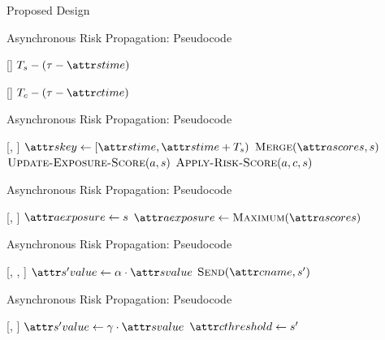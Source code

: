 \documentclass[11pt]{beamer}
\begin{document}
\begin{section}{Proposed Design}
\begin{frame}{Asynchronous Risk Propagation: Pseudocode}
\begin{function}{\nRiskScoreTtl}[\vScore]
  \State \Return $\pScoreExpiry - (\vReferenceTime - \aScoreTime)$
\end{function}
\begin{function}{\nContactTtl}[\vContact]
  \State \Return $\pContactExpiry - (\vReferenceTime - \aContactTime)$
\end{function}
\end{frame}

\begin{frame}{Asynchronous Risk Propagation: Pseudocode}
\begin{function}{\nHandleRiskScore}[\vActor, \vScore]
    \pause
    \State $\aScoreKey \assign [\aScoreTime, \aScoreTime + \pScoreExpiry)$
    \pause
    \State $\cMerge[\aActorScores, \vScore]$
    \pause
    \State $\cUpdateExposureScore[\vActor, \vScore]$
    \pause
    \ForEach{$\vContact \in \aActorContacts$}
      \State $\cApplyRiskScore[\vActor, \vContact, \vScore]$
    \EndFor
  \EndIf
\end{function}
\end{frame}

\begin{frame}{Asynchronous Risk Propagation: Pseudocode}
\begin{function}{\nUpdateExposureScore}[\vActor, \vScore]
  \If{$\aActorExposureValue < \aScoreValue$}
    \pause
    \State $\aActorExposure \assign \vScore$
  \pause
    \pause
    \State $\aActorExposure \assign \cMaximum[\aActorScores]$
  \EndIf
\end{function}
\end{frame}

\begin{frame}{Asynchronous Risk Propagation: Pseudocode}
\begin{function}{\nApplyRiskScore}[\vActor, \vContact, \vScore]
  \If{$\aContactTime + \pTimeBuffer > \aScoreTime$}
    \pause
    \State $\aNewScoreValue \assign \pTransmissionRate \cdot \aScoreValue$
    \pause
    \State $\cSend[\aContactName, \vNewScore]$
  \EndIf
\end{function}
\end{frame}

\begin{frame}{Asynchronous Risk Propagation: Pseudocode}
\begin{function}{\nSetSendThreshold}[\vContact, \vScore]
  \State $\aNewScoreValue \assign \pSendCoefficient \cdot \aScoreValue$
  \pause
  \State $\aContactThreshold \assign \vNewScore$
\end{function}
\end{frame}


\end{section}
\end{document}

